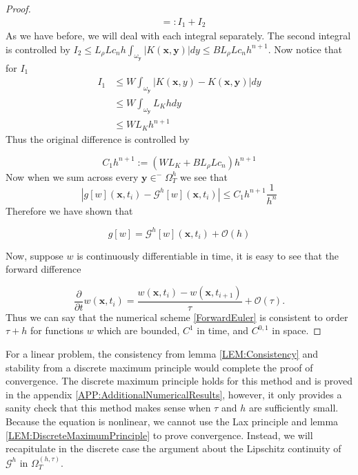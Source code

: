 \documentclass[aps,
preprint,
groupedaddress,
showkeys,
amsmath]{revtex4-2}
\begin{document}
\begin{proof}
\begin{equation*}
\begin{split}
                &=:I_1+I_2
            \end{split}
        \end{equation*}
        As we have before, we will deal with each integral separately. The second integral is controlled by $I_2\leq L_\rho Lc_nh\int_{\omega_\mathbf{y}}|K(\mathbf{x},\mathbf{y})|dy\leq B L_\rho Lc_nh^{n+1}$. Now notice that for $I_1$
          \begin{equation*}
              \begin{split}
                  I_1&\leq W\int_{\omega_\mathbf{y}}|K(\mathbf{x},y)-K(\mathbf{x},\mathbf{y})|dy\\
                    &\leq W\int_{\omega_\mathbf{y}}L_Khdy\\
                    &\leq WL_Kh^{n+1}
                \end{split}
          \end{equation*}
          Thus the original difference is controlled by 
          
         \[C_1h^{n+1}:=(WL_K+BL_\rho Lc_n)h^{n+1}\]
        Now when we sum across every $\mathbf{y}\in ^-\Omega^h_T$ we see that 
          \begin{equation*}
              |g[w](\mathbf{x},t_i)-\mathcal{G}^h[w](\mathbf{x},t_i)|\leq C_1h^{n+1}\frac{1}{h^{n}}
          \end{equation*}
        Therefore we have shown that 
        
       \[g[w]=\mathcal{G}^h[w](\mathbf{x},t_i)+\mathcal{O}(h)\]

        Now, suppose $w$ is continuously differentiable in time, it is easy to see that the forward difference 
        
       \[\frac{\partial}{\partial t}w(\mathbf{x},t_i)=\frac{w(\mathbf{x},t_i)-w(\mathbf{x},t_{i+1})}{\tau}+\mathcal{O}(\tau).\] Thus we can say that the numerical scheme \eqref{ForwardEuler} is consistent to order $\tau+h$ for functions $w$ which are bounded, $C^1$ in time, and $C^{0,1}$ in space. 
    \end{proof}
    For a linear problem, the consistency from lemma \ref{LEM:Consistency} and stability from a discrete maximum principle would complete the proof of convergence. The discrete maximum principle holds for this method and is proved in the appendix \ref{APP:AdditionalNumericalResults}, however, it only provides a sanity check that this method makes sense when $\tau$ and $h$ are sufficiently small. Because the equation is nonlinear, we cannot use the Lax principle and lemma \ref{LEM:DiscreteMaximumPrinciple} to prove convergence. Instead, we will recapitulate in the discrete case the argument about the Lipschitz continuity of $\mathcal{G}^h$ in $\Omega^{(h,\tau)}_T$. 
\end{document}

